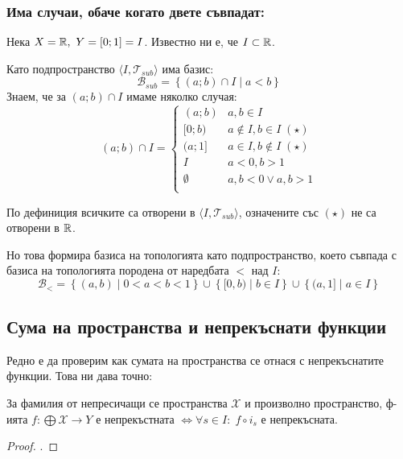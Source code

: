 \subsubsection*{Има случаи, обаче когато двете съвпадат:}
\begin{example}
    Нека $X = {\mathbb{R}},\ Y = [0; 1] = I$. Известно ни е, че $I \subset {\mathbb{R}}$.

    Като подпространство $\langle I, \mathcal T_{sub}\rangle$ има базис:
    \begin{equation}
        \mathcal B_{sub} = \left\{(a; b) \cap I\mid a < b\right\}
    \end{equation}
    Знаем, че за $(a; b) \cap I$ имаме няколко случая:
    \begin{equation}
        (a; b) \cap I = \begin{cases}
            (a; b)      & a, b \in I \\
            [0; b)      & a \notin I, b \in I\; (\star)\\
            (a; 1]      & a \in I, b \notin I\; (\star)\\
            I           & a < 0, b > 1 \\
            \emptyset   & a, b < 0 \lor a, b > 1 \\
        \end{cases}
    \end{equation}

    По дефиниция всичките са отворени в $\langle I, \mathcal T_{sub} \rangle$, означените със $(\star)$ не са отворени в ${\mathbb{R}}$. 
    
    Но това формира базиса на топологията като подпространство, което съвпада с базиса на топологията породена от наредбата $<$ над $I$:
    \begin{equation}
         \mathcal B_< = \left\{(a,b) \mid 0 < a < b < 1\right\} \cup \left\{ [0, b) \mid b \in I \right\} \cup \left\{ (a, 1] \mid a \in I \right\}
    \end{equation}
\end{example}

\subsection{Сума на пространства и непрекъснати функции}
Редно е да проверим как сумата на пространства се отнася с непрекъснатите функции. Това ни дава точно:
\begin{theorem}
    За фамилия от непресичащи се пространства $\mathcal X$ и произволно пространство, ф-ията $f : \bigoplus \mathcal X \to Y$ е непрекъстната $\iff \forall s \in I:\; f \circ  i_s$ е непрекъсната.
\end{theorem}
\begin{proof}
    \cite[p.~75]{engelking1989general}.
\end{proof}

